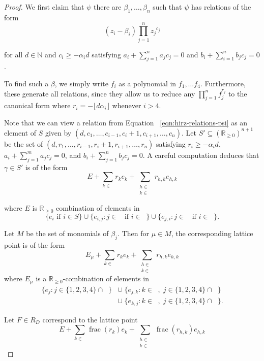 \documentclass{amsart}
\theoremstyle{plain}
\theoremstyle{definition}
\theoremstyle{remark}
\numberwithin{equation}{section}
\newcommand\bida{a}
\newcommand\bidb{b}
\DeclareMathOperator{\fr}{frac}
\DeclareMathOperator{\Te}{T_=}
\DeclareMathOperator{\Tp}{T_+}
\DeclareMathOperator{\Tm}{T_-}
\begin{document}
\begin{proof}
We first claim that $\psi$ there are $\beta_1, \ldots, \beta_n$ such that $\psi$ has relations of the form
\begin{equation}
\label{eqn:hirz-relations-psi}
	(z_i - \beta_i)\prod_{j=1}^n {z_j}^{c_{j}}
\end{equation}

\noindent
for all $d \in \mathbb{N}$ and $c_i \ge -\alpha_i d$ satisfying $\bida_i + \sum_{j = 1}
^n \bida_j c_j = 0$ and $\bidb_i + \sum_{i=1}^n \bidb_j c_j = 0$.

To find such a $\beta$, we simply write $f_i$ as a 
polynomial in $f_1, \ldots f_4$. Furthermore, these
generate all relations, since they allow us to reduce any $\prod_{j =
1}^n f_j^{r_j}$ to the canonical form where $r_i = - \lfloor d \alpha_i \rfloor$ whenever $i > 4$.

Note that we can view a relation from Equation
~\ref{eqn:hirz-relations-psi} as an element of $S$ given
by $(d, c_1, \ldots, c_{i-1}, c_i + 1, c_{i+1}, \ldots , c_n)$.  Let $S'\subseteq (\mathbb{R}_{\ge 0})^{n+1}$ be the
set of $(d, r_1, \ldots, r_{i-1}, r_i + 1, r_{i+1}, \ldots , r_n)$ satisfying $r_i \ge -\alpha_i d$,
$\bida_i + \sum_{j = 1}^m \bida_j c_j = 0$, and $\bidb_i + \sum_{j=1}^n \bidb_j c_j
= 0$.  A careful computation deduces that $\gamma \in S'$ is of the form 
\[
	E + \sum_{k\in \Te} r_k e_k + \sum_{\substack{h \in \Tp \\ k \in \Tm}} r_{h,k} e_{h,k}
\] 

\noindent
where $E$ is $\mathbb{R}_{\ge 0}$
combination of elements in 
\[
	\{e_i \mbox{ if } i \in S\} \cup \{e_{i, j}: j \in \Tm \mbox{ if }
	i	\in \Tp \} \cup \{e_{j, i}: j \in \Tp \mbox{ if } i \in \Tm \}.
\]


Let $M$ be the set of monomials of $\beta_j$.  Then for $\mu\in M$, the corresponding lattice point is of the form
\[
	E_\mu + \sum_{k\in \Te} r_k e_k + \sum_{\substack{
	h \in \Tp \\ k \in \Tm}} r_{h,k} e_{h,k}
\]
where $E_\mu$ is a $\mathbb{R}_{\ge 0}$-combination of elements in
\begin{align*}
	\{e_j : j \in \{1, 2, 3, 4\} \cap \Te\}
	&\cup \; \{e_{j, k}: k \in \Tm, \; j \in \{1, 2, 3, 4\} \cap \Te\} \\
	&\cup \; \{e_{k, j}: k \in \Tp, \; j \in \{1, 2, 3, 4\} \cap \Tm\}.
\end{align*}

Let $F \in R_D$ correspond to the lattice point
\[
	E + \sum_{k \in \Te} \fr(r_k) e_k + \sum_{\substack{h \in \Tp \\
	k \in \Tm}} \fr(r_{h,k}) e_{h,k}
\]


\end{proof}
\end{document}
